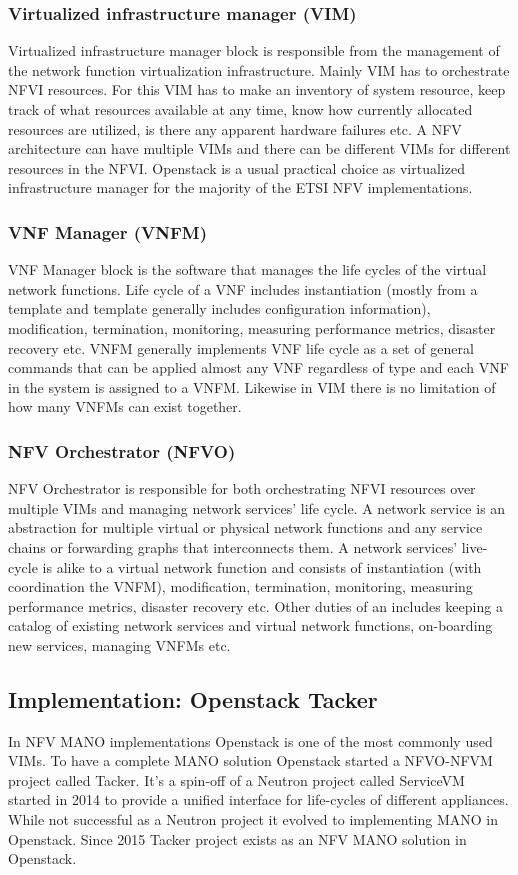 \documentclass[12pt,oneandhalf,chaparabic,ceng,ms,eng,oneside,pntc]{gsufbe}
\begin{document}
\subsubsection{Virtualized infrastructure manager (VIM)}
Virtualized infrastructure manager block is responsible from the management of the network function
virtualization infrastructure. Mainly VIM has to orchestrate NFVI resources. For this VIM has to make
an inventory of system resource, keep track of what resources available at any time, know how currently
allocated resources are utilized, is there any apparent hardware failures etc.
A NFV architecture can have multiple VIMs and there can be different VIMs for different resources in 
the NFVI. Openstack is a usual practical choice as virtualized infrastructure manager for the majority
of the ETSI NFV implementations.

\subsubsection{VNF Manager (VNFM)}
VNF Manager block is the software that manages the life cycles of the virtual network functions. Life
cycle of a VNF includes instantiation (mostly from a template and template generally includes
configuration information), modification, termination, monitoring, measuring performance metrics,
disaster recovery etc. VNFM generally implements VNF life cycle as a set of general commands that can
be applied almost any VNF regardless of type and each VNF in the system is assigned to a VNFM.
Likewise in VIM there is no limitation of how many VNFMs can exist together.

\subsubsection{NFV Orchestrator (NFVO)}
NFV Orchestrator is responsible for both orchestrating NFVI resources over multiple VIMs and managing
network services' life cycle. A network service is an abstraction for multiple virtual or physical
network functions and any service chains or forwarding graphs that interconnects them. A network
services' live-cycle is alike to a virtual network function and consists of instantiation (with
coordination the VNFM), modification, termination, monitoring, measuring performance metrics, disaster
recovery etc. Other duties of an includes keeping a catalog of existing network services and virtual
network functions, on-boarding new services, managing VNFMs etc.

\subsection{Implementation: Openstack Tacker}
In NFV MANO implementations Openstack is one of the most commonly used VIMs. To have a complete MANO
solution Openstack started a NFVO-NFVM project called Tacker. It's a spin-off of a Neutron project
called ServiceVM started in 2014 to provide a unified interface for life-cycles of different
appliances. While not successful as a Neutron project it evolved to implementing MANO in Openstack.
Since 2015 Tacker project exists as an NFV MANO solution in Openstack.
\end{document}
